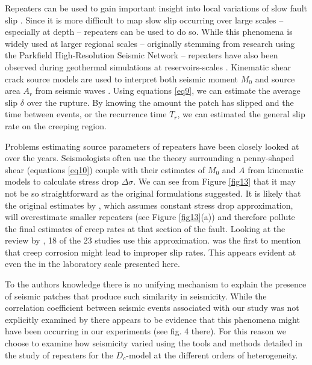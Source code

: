 \documentclass[final,3p, 11pt,authoryear]{elsarticle}
\begin{document}
Repeaters can be used to gain important insight into local variations of slow fault slip \citep[]{Nadeau1994, Kato2012, Igarashi2003}. Since it is more difficult to map slow slip occurring over large scales -- especially at depth -- repeaters can be used to do so. While this phenomena is widely used at larger regional scales -- originally stemming from research using the Parkfield High-Resolution Seismic Network -- repeaters have also been observed during geothermal simulations at reservoirs-scales \citep{Lengline2014, Cauchie2020}. Kinematic shear crack source models are used to interpret both seismic moment $M_{0}$ and source area $A_{r}$ from seismic waves \cite[]{Brune1970, Madariaga1976, Hanks1979}.  Using equations \eqref{eq9}, we can estimate the average slip $\delta$ over the rupture. By knowing the amount the patch has slipped and the time between events, or the recurrence time $T_{r}$, we can estimated the general slip rate on the creeping region.

Problems estimating source parameters of repeaters have been closely looked at over the years. Seismologists often use the theory surrounding a penny-shaped shear (equations \eqref{eq10}) couple with their estimates of $M_{0}$ and $A$ from kinematic models to calculate stress drop $\Delta\sigma$. We can see from Figure \ref{fig13} that it may not be so straightforward as the original formulations suggested. It is likely that the original estimates by \citet{Nadeau1998}, which assumes constant stress drop approximation, will overestimate smaller repeaters (see Figure \ref{fig13}(a)) and therefore pollute the final estimates of creep rates at that section of the fault.  Looking at the review by \citet{Uchida2019}, 18 of the 23 studies use this approximation. \citet{Beeler2001} was the first to mention that creep corrosion might lead to improper slip rates. This appears evident at even the in the laboratory scale presented here.

To the authors knowledge there is no unifying mechanism to explain the presence of seismic patches that produce such similarity in seismicity.  While the correlation coefficient between seismic events associated with our study was not explicitly examined by \citet{Selvadurai2019} there appears to be evidence that this phenomena might have been occurring in our experiments (see fig. 4 there). For this reason we choose to examine how seismicity varied using the tools and methods detailed in the study of repeaters for the $D_{c}$-model at the different orders of heterogeneity. 
\end{document}
